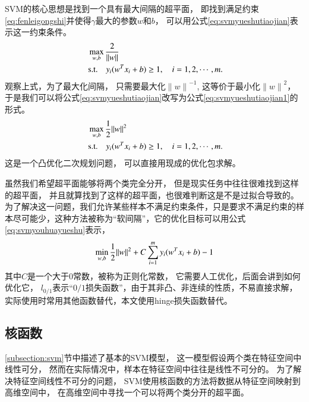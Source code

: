 SVM的核心思想是找到一个具有最大间隔的超平面，
即找到满足约束\eqref{eq:fenleigongshi}并使得$\gamma$最大的参数$w$和$b$，
可以用公式\eqref{eq:svmyueshutiaojian}表示这一约束条件。
\begin{equation}
\centering
\begin{aligned}
&\ \max_{w,b}{\frac{2}{\lVert w\rVert}}\\
&\ \mbox{s.t.}\quad y_i(w^Tx_i+b)\ge 1, \quad i=1,2,\cdots ,m.
\end{aligned}
\label{eq:svmyueshutiaojian}
\end{equation}
观察上式，为了最大化间隔，
只需要最大化${\lVert w\rVert}^{-1}$,
这等价于最小化${\lVert w\rVert}^2$，
于是我们可以将公式\eqref{eq:svmyueshutiaojian}改写为公式\eqref{eq:svmyueshutiaojian1}的形式。
\begin{equation}
\centering
\begin{aligned}
&\ \max_{w,b}{\frac{1}{2}\lVert w\rVert^2}\\
&\ \mbox{s.t.}\quad y_i(w^Tx_i+b)\ge 1,\quad i=1,2,\cdots ,m.
\end{aligned}
\label{eq:svmyueshutiaojian1}
\end{equation}
这是一个凸优化二次规划问题，
可以直接用现成的优化包求解。

虽然我们希望超平面能够将两个类完全分开，
但是现实任务中往往很难找到这样的超平面，
并且就算找到了这样的超平面，也很难判断这是不是过拟合导致的。
为了解决这一问题，我们允许某些样本不满足约束条件，只是要求不满足约束的样本尽可能少，这种方法被称为“软间隔”，它的优化目标可以用公式\eqref{eq:svmyouhuayueshu}表示，
\begin{equation}
\centering
\min_{w,b}{\frac{1}{2}\lVert w\rVert^2}+C\sum_{i=1}^{m}{y_i(w^Tx_i+b)-1}
\label{eq:svmyouhuayueshu}
\end{equation}
其中$C$是一个大于0常数，被称为正则化常数，
它需要人工优化，后面会讲到如何优化它，
$l_{0/1}$表示“$0/1$损失函数”，由于其非凸、非连续的性质，不易直接求解，实际使用时常用其他函数替代，本文使用hinge损失函数替代。

\subsection{核函数}

\ref{subsection:svm}节中描述了基本的SVM模型，
这一模型假设两个类在特征空间中线性可分，
然而在实际情况中，样本在特征空间中往往是线性不可分的。
为了解决特征空间线性不可分的问题，
SVM使用核函数的方法将数据从特征空间映射到高维空间中，
在高维空间中寻找一个可以将两个类分开的超平面。


